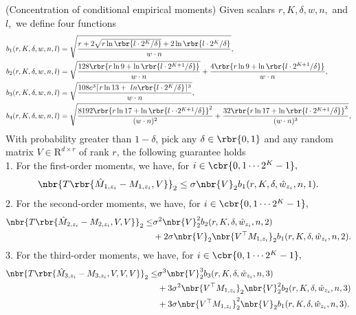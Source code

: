 \documentclass[twoside,11pt]{article}
\begin{document}
{%
\begin{lemma}{(Concentration of conditional empirical moments)}
  \label{lem:submoment}
  Given scalars $r, K, \delta, w, n,$ and $l,$ we define four functions
  \begin{align*}
  b_1(r, K, \delta, w, n, l) &= \sqrt{ \frac{r +2\sqrt{r \ln \rbr{l \cdot 2^K/\delta} }  
  + 2 \ln \rbr {l \cdot 2^K/\delta} }{w \cdot n} },\\
  b_2(r, K, \delta, w, n, l) &=  \sqrt{\frac{128 \rbr{r \ln 9 + \ln \rbr{l \cdot 2^{K+1}/\delta}}}{w \cdot n} }+ 
   \frac{4 \rbr{r \ln9+ \ln \rbr{l \cdot 2^{K+1}/\delta}}}{w \cdot n} ,\\
  b_3(r, K, \delta, w, n, l) &=   \sqrt{ \frac{108e^3 \lceil r \ln13+\ ln \rbr{l \cdot2^K/\delta} \rceil^3}{w \cdot n} } ,\\
  b_4(r, K, \delta, w, n, l) &=      \sqrt{\frac{8192 \rbr{r\ln 17 +\ln \rbr{l \cdot \cdot 2^{K+1} /\delta}}^2 }{(w \cdot n)^2}  +\frac{32\rbr{r\ln 17 +\ln \rbr{l\cdot 2^{K+1}/\delta}}^3 }{(w \cdot n)^3} }  ,
  \end{align*} 
  With probability greater than $1 - \delta$, pick any $\delta \in \rbr{0,1}$ and any random matrix $V \in \mathrm{R}^{d \times r}$ of rank $r$, the following guarantee holds\\
1. For the first-order moments, we have, for $ i \in \cbr{0,1 \cdots 2^K-1},$ 
  \begin{align*}
    \nbr{T \rbr{\hat{M}_{1,z_i} - M_{1,z_i}, V}}_2 \leq \sigma \nbr{V}_2 b_1(r, K, \delta, \hat{w}_{z_i}, n, 1).
  \end{align*}
2. For the second-order moments, we have, for $ i \in \cbr{0,1 \cdots 2^K-1},$
  \begin{align*}
    \nbr{ T\rbr{\hat{M}_{2,z_i} - M_{2,z_i},V,V}}_2  \leq
    & \sigma^2  \nbr{V}_2^2 b_2(r, K, \delta, \hat{w}_{z_i}, n, 2)\\
     &+  2 \sigma \nbr{V}_2 \nbr{V^\top M_{1,z_i}}_2 b_1(r, K, \delta, \hat{w}_{z_i}, n, 2).
  \end{align*}
3. For the third-order moments, we have, for $ i \in \cbr{0,1 \cdots 2^K-1},$
  \begin{align*}
    \nbr{ T\rbr{\hat{M}_{3,z_i} - M_{3,z_i},V,V,V}}_2 \leq &\sigma^3 \nbr{V}_2^3  b_3(r, K, \delta, \hat{w}_{z_i}, n, 3) \\
    &+ 3 \sigma^2  \nbr{V^\top M_{1,z_i}}_2  \nbr{V}_2^2 b_2 (r, K, \delta, \hat{w}_{z_i}, n, 3)\\
& + 3\sigma \nbr{V^\top M_{1,z_i}}_2^2 \nbr{V}_2 b_1 (r, K, \delta, \hat{w}_{z_i}, n, 3).

\end{align*}
\end{lemma}}
\end{document}
